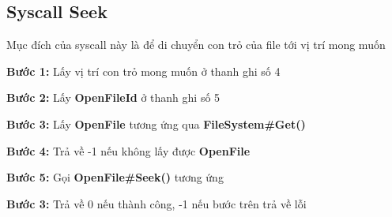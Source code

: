 \subsection{Syscall Seek}
Mục đích của syscall này là để di chuyển con trỏ của file tới vị trí mong muốn
\begin{addmargin}[40pt]{0pt}
\textbf{Bước 1: }Lấy vị trí con trỏ mong muốn ở thanh ghi số 4
\end{addmargin}
\begin{addmargin}[40pt]{0pt}
\textbf{Bước 2: }Lấy \textbf{OpenFileId} ở thanh ghi số 5
\end{addmargin}
\begin{addmargin}[40pt]{0pt}
\textbf{Bước 3: }Lấy \textbf{OpenFile} tương ứng qua \textbf{FileSystem\#Get()}
\end{addmargin}
\begin{addmargin}[40pt]{0pt}
\textbf{Bước 4: }Trả về -1 nếu không lấy được \textbf{OpenFile}
\end{addmargin}
\begin{addmargin}[40pt]{0pt}
\textbf{Bước 5: }Gọi \textbf{OpenFile\#Seek()} tương ứng
\end{addmargin}
\begin{addmargin}[40pt]{0pt}
\textbf{Bước 3: }Trả về 0 nếu thành công, -1 nếu bước trên trả về lỗi
\end{addmargin}

